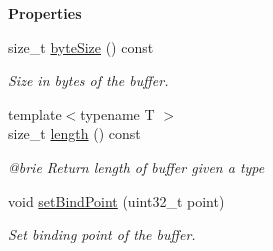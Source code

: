 \begin{Indent}\textbf{ Properties}\par
\begin{DoxyCompactItemize}
\item 
\mbox{\label{classrev_1_1_g_l_buffer_aaadd13150c9c4fdf2554a86160d6156b}} 
size\+\_\+t \mbox{\hyperlink{classrev_1_1_g_l_buffer_aaadd13150c9c4fdf2554a86160d6156b}{byte\+Size}} () const
\begin{DoxyCompactList}\small\item\em Size in bytes of the buffer. \end{DoxyCompactList}\item 
\mbox{\label{classrev_1_1_g_l_buffer_a15e3457786a2c14008a8b14b12a82c03}} 
{\footnotesize template$<$typename T $>$ }\\size\+\_\+t \mbox{\hyperlink{classrev_1_1_g_l_buffer_a15e3457786a2c14008a8b14b12a82c03}{length}} () const
\begin{DoxyCompactList}\small\item\em @brie Return length of buffer given a type \end{DoxyCompactList}\item 
\mbox{\label{classrev_1_1_g_l_buffer_a256280873df6cd8dc20319bf9651f269}} 
void \mbox{\hyperlink{classrev_1_1_g_l_buffer_a256280873df6cd8dc20319bf9651f269}{set\+Bind\+Point}} (uint32\+\_\+t point)
\begin{DoxyCompactList}\small\item\em Set binding point of the buffer. \end{DoxyCompactList}\end{DoxyCompactItemize}
\end{Indent}
